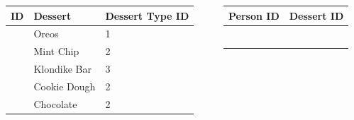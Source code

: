 \documentclass[aspectratio=169]{beamer}
\begin{document}
\begin{frame}
  \begin{columns}[T]
    \begin{column}{0.3\textwidth}
      \begin{table}[]
        \footnotesize
        \begin{tabular}{@{}llp{5em}@{}}
          \toprule
          ID              & Dessert      & Dessert Type ID \\ \midrule
          \color{blue}{1} & Oreos        & 1               \\
          \color{blue}{2} & Mint Chip    & 2               \\
          \color{blue}{3} & Klondike Bar & 3               \\
          \color{blue}{4} & Cookie Dough & 2               \\
          \color{blue}{5} & Chocolate    & 2               \\ \bottomrule
        \end{tabular}
      \end{table}
    \end{column}
    \begin{column}{0.5\textwidth}
      \begin{table}[]
        \footnotesize
        \begin{tabular}{@{}ll@{}}
          \toprule
          Person ID         & Dessert ID        \\ \midrule
          \color{purple}{1} & \color{purple}{1} \\
          \color{purple}{1} & \color{purple}{2} \\
          \color{purple}{2} & \color{purple}{3} \\
          \color{purple}{3} & \color{purple}{2} \\
          \color{purple}{4} & \color{purple}{4} \\
          \color{purple}{5} & \color{purple}{5} \\ \bottomrule
        \end{tabular}
      \end{table}
    \end{column}
  \end{columns}
\end{frame}
\end{document}
